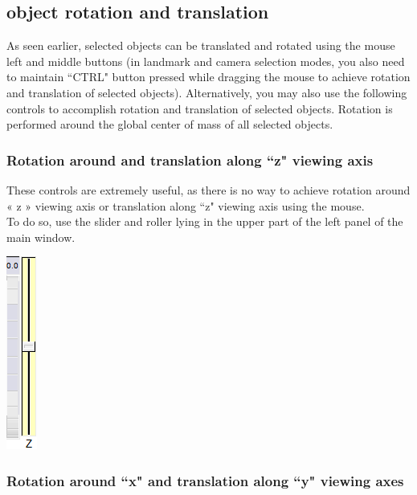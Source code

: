 \subsection{object rotation and translation}
	As seen earlier, selected objects can be translated and rotated using the mouse left and middle buttons
(in landmark and camera selection modes, you also need to maintain ``CTRL" button pressed
while dragging the mouse to achieve rotation and translation of selected objects). Alternatively, you
may also use the following controls to accomplish rotation and translation of selected objects. Rotation
is performed around the global center of mass of all selected objects.

\subsubsection{Rotation around and translation along ``z" viewing axis}

\begin{minipage}{0.7\textwidth}
These controls are extremely useful, as there is no way to achieve rotation
around « z » viewing axis or translation along ``z" viewing axis using the
mouse. \\
To do so, use the slider and roller lying in the upper part of the left panel of the
main window.

\end{minipage}    
\begin{minipage}{0.25\textwidth}\centering
  \includegraphics[scale=0.5]{images/Icons/x_rot.png}
 \end{minipage}    


\subsubsection{Rotation around ``x" and translation along ``y" viewing axes}

